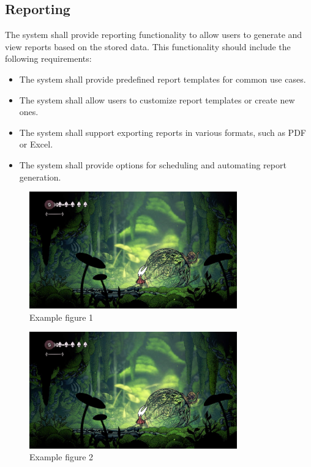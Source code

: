 \subsection{Reporting}
The system shall provide reporting functionality to allow users to generate and view reports based on the stored data. This functionality should include the following requirements:

\begin{itemize}
    \item The system shall provide predefined report templates for common use cases.
    \item The system shall allow users to customize report templates or create new ones.
    \item The system shall support exporting reports in various formats, such as PDF or Excel.
    \item The system shall provide options for scheduling and automating report generation.
\end{itemize}

\begin{figure}[ht]
    \centering
    \includegraphics[width=0.8\textwidth]{images/figure1}
    \caption{Example figure 1}
    \label{fig:figure1}
\end{figure}

\begin{figure}[ht]
    \centering
    \includegraphics[width=0.8\textwidth]{images/figure1}
    \caption{Example figure 2}
    \label{fig:figure2}
\end{figure}
